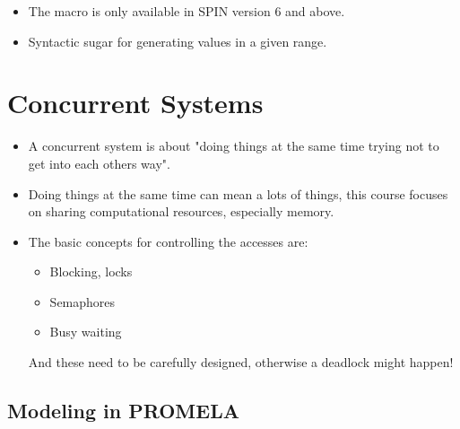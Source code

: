 			\begin{itemize}
				\item The  macro is only available in SPIN version 6 and above.
				\item Syntactic sugar for generating values in a given range.
			\end{itemize}

\section{Concurrent Systems}
	\begin{itemize}
		\item A concurrent system is about "doing things at the same time trying not to get into each others way".
		\item Doing things at the same time can mean a lots of things, this course focuses on sharing computational resources, especially memory.
		\item The basic concepts for controlling the accesses are:
			\begin{itemize}
				\item Blocking, locks
				\item Semaphores
				\item Busy waiting
			\end{itemize}
			And these need to be carefully designed, otherwise a deadlock might happen!
	\end{itemize}

	\subsection{Modeling in PROMELA}
		

